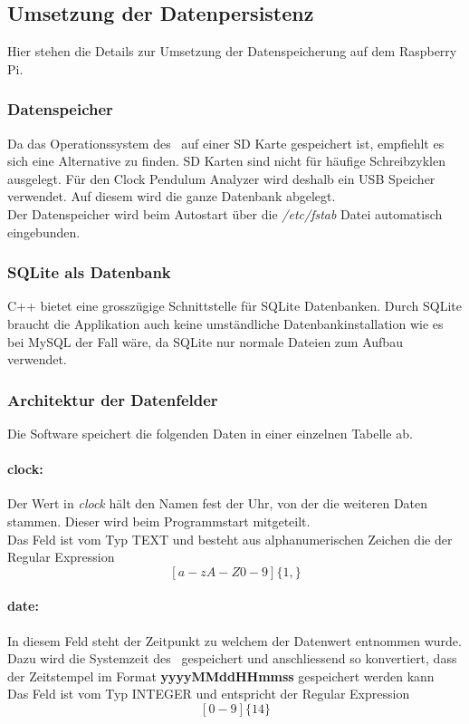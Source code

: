 \subsection{Umsetzung der Datenpersistenz}
    Hier stehen die Details zur Umsetzung der Datenspeicherung auf dem Raspberry Pi.
    \subsubsection{Datenspeicher}
    Da das Operationssystem des \rpi\ auf einer SD Karte gespeichert ist, empfiehlt es sich eine Alternative zu finden. SD Karten sind nicht für häufige Schreibzyklen ausgelegt. Für den Clock Pendulum Analyzer wird deshalb ein USB Speicher verwendet. Auf diesem wird die ganze Datenbank abgelegt.\\
    Der Datenspeicher wird beim Autostart über die \textit{/etc/fstab} Datei automatisch eingebunden.
    
    \subsubsection{SQLite als Datenbank}
    C++ bietet eine grosszügige Schnittstelle für SQLite Datenbanken. Durch SQLite braucht die Applikation auch keine umständliche Datenbankinstallation wie es bei MySQL der Fall wäre, da SQLite nur normale Dateien zum Aufbau verwendet.
    
    \subsubsection{Architektur der Datenfelder}
    Die Software speichert die folgenden Daten in einer einzelnen Tabelle ab.
    \paragraph{clock:}
    Der Wert in \textit{clock} hält den Namen fest der Uhr, von der die weiteren Daten stammen. Dieser wird beim Programmstart mitgeteilt.\\
    Das Feld ist vom Typ TEXT und besteht aus alphanumerischen Zeichen die der Regular Expression $$[a-zA-Z0-9]\{1,\}$$
    \paragraph{date:}\label{sec:db_date}
    In diesem Feld steht der Zeitpunkt zu welchem der Datenwert entnommen wurde. Dazu wird die Systemzeit des \rpi\ gespeichert und anschliessend so konvertiert, dass der Zeitstempel im Format \textbf{yyyyMMddHHmmss} gespeichert werden kann\\
    Das Feld ist vom Typ INTEGER und entspricht der Regular Expression
    $$[0-9]\{14\}$$
